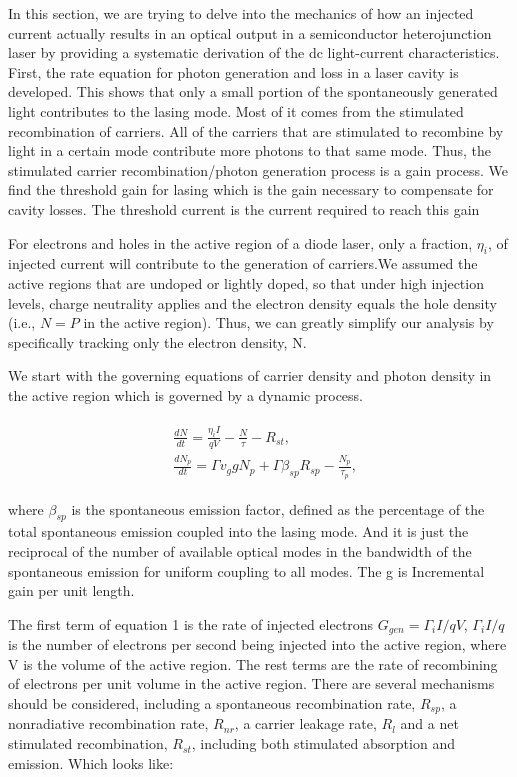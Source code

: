 In this section, we are trying to delve into the mechanics of how an injected
current actually results in an optical output in a semiconductor heterojunction
laser by providing a systematic derivation of the dc light-current
characteristics. First, the rate equation for photon generation and loss in a
laser cavity is developed. This shows that only a small portion of the
spontaneously generated light contributes to the lasing mode. Most of it comes
from the stimulated recombination of carriers. All of the carriers that are
stimulated to recombine by light in a certain mode contribute more photons to
that same mode. Thus, the stimulated carrier recombination/photon generation
process is a gain process. We find the threshold gain for lasing which is the
gain necessary to compensate for cavity losses. The threshold current is the
current required to reach this gain 

For electrons and holes in the active region of a diode laser, only a fraction,
$\eta_i$, of injected current will contribute to the generation of carriers.We
assumed the active regions that are undoped or lightly doped, so that under
high injection levels, charge neutrality applies and the electron density
equals the hole density (i.e., $N = P$ in the active region). Thus, we can
greatly simplify our analysis by specifically tracking only the electron
density, N.

We start with the governing equations of carrier density and photon density in
the active region which is governed by a dynamic process.

\begin{eqnarray}
\begin{aligned}
  & \frac{dN}{dt} = \frac{\eta_{i}I}{qV} - \frac{N}{\tau} - R_{st},
  \\
  & \frac{dN_p}{dt} = {\Gamma}v_g{g}N_p + \Gamma\beta_{sp}R_{sp} - \frac{N_p}{\tau_p},
\end{aligned}
\label{eq:eight}
\end{eqnarray}

where $\beta_{sp}$ is the spontaneous emission factor, defined as the
percentage of the total spontaneous emission coupled into the lasing mode. And it is
just the reciprocal of the number of available optical modes in the bandwidth of
the spontaneous emission for uniform coupling to all modes. The g is Incremental gain
per unit length.

The first term of equation 1 is the rate of injected electrons $G_{gen} =
{\Gamma_{i}I}/{qV}$, ${\Gamma_{i}I}/{q}$ is the number of electrons per
second being injected into the active region, where V is the volume of the
active region. The rest terms are the rate of recombining of electrons per unit
volume in the active region. There are several mechanisms should be considered,
including a spontaneous recombination rate, $R_{sp}$, a nonradiative
recombination rate, $R_{nr}$, a carrier leakage rate, $R_l$ and a net
stimulated recombination, $R_{st}$, including both stimulated absorption and
emission. Which looks like:

